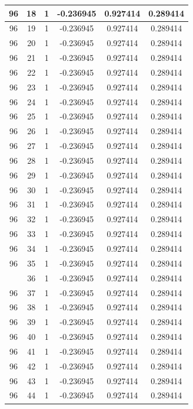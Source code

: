 \documentclass[12pt,a4paper]{article}
\numberwithin{equation}{section}
\numberwithin{figure}{section}
\numberwithin{table}{section}
\begin{document}
\begin{longtable}{|c|c|c|c|c|c|}
96 & 18 & 1 & -0.236945 & 0.927414 & 0.289414 \\ \hline
96 & 19 & 1 & -0.236945 & 0.927414 & 0.289414 \\ \hline
96 & 20 & 1 & -0.236945 & 0.927414 & 0.289414 \\ \hline
96 & 21 & 1 & -0.236945 & 0.927414 & 0.289414 \\ \hline
96 & 22 & 1 & -0.236945 & 0.927414 & 0.289414 \\ \hline
96 & 23 & 1 & -0.236945 & 0.927414 & 0.289414 \\ \hline
96 & 24 & 1 & -0.236945 & 0.927414 & 0.289414 \\ \hline
96 & 25 & 1 & -0.236945 & 0.927414 & 0.289414 \\ \hline
96 & 26 & 1 & -0.236945 & 0.927414 & 0.289414 \\ \hline
96 & 27 & 1 & -0.236945 & 0.927414 & 0.289414 \\ \hline
96 & 28 & 1 & -0.236945 & 0.927414 & 0.289414 \\ \hline
96 & 29 & 1 & -0.236945 & 0.927414 & 0.289414 \\ \hline
96 & 30 & 1 & -0.236945 & 0.927414 & 0.289414 \\ \hline
96 & 31 & 1 & -0.236945 & 0.927414 & 0.289414 \\ \hline
96 & 32 & 1 & -0.236945 & 0.927414 & 0.289414 \\ \hline
96 & 33 & 1 & -0.236945 & 0.927414 & 0.289414 \\ \hline
96 & 34 & 1 & -0.236945 & 0.927414 & 0.289414 \\ \hline
96 & 35 & 1 & -0.236945 & 0.927414 & 0.289414 \\ \hline
\pagebreak
96 & 36 & 1 & -0.236945 & 0.927414 & 0.289414 \\ \hline
96 & 37 & 1 & -0.236945 & 0.927414 & 0.289414 \\ \hline
96 & 38 & 1 & -0.236945 & 0.927414 & 0.289414 \\ \hline
96 & 39 & 1 & -0.236945 & 0.927414 & 0.289414 \\ \hline
96 & 40 & 1 & -0.236945 & 0.927414 & 0.289414 \\ \hline
96 & 41 & 1 & -0.236945 & 0.927414 & 0.289414 \\ \hline
96 & 42 & 1 & -0.236945 & 0.927414 & 0.289414 \\ \hline
96 & 43 & 1 & -0.236945 & 0.927414 & 0.289414 \\ \hline
96 & 44 & 1 & -0.236945 & 0.927414 & 0.289414 \\ \hline

\end{longtable}
\end{document}
